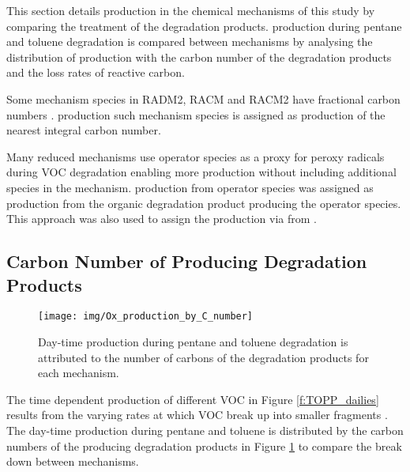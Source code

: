 This section details  production in the chemical mechanisms of this study by comparing the treatment of the degradation products.
 production during pentane and toluene degradation is compared between mechanisms by analysing the distribution of  production with the carbon number of the degradation products and the loss rates of reactive carbon.

Some mechanism species in RADM2, RACM and RACM2 have fractional carbon numbers \citep{Stockwell:1990, Stockwell:1997, Goliff:2013}.
 production such mechanism species is assigned as  production of the nearest integral carbon number.

Many reduced mechanisms use operator species as a proxy for peroxy radicals during VOC degradation enabling more  production without including additional species in the mechanism.
 production from operator species was assigned as  production from the organic degradation product producing the operator species.
This approach was also used to assign the  production via  from .

\subsection[Carbon Number of Ox Producing Degradation Products]{Carbon Number of  Producing Degradation Products} \label{ss:c_number} %

\begin{figure}
    \centering
    \texttt{[image: img/Ox\_production\_by\_C\_number]}
    \vspace{0mm}
    \caption{Day-time  production during pentane and toluene degradation is attributed to the number of carbons of the degradation products for each mechanism.}
    \vspace{-4mm}
    \label{f:carbon}
\end{figure}

The time dependent  production of different VOC in Figure \ref{f:TOPP_dailies} results from the varying rates at which VOC break up into smaller fragments \citep{Butler:2011}.
The day-time  production during pentane and toluene is distributed by the carbon numbers of the  producing degradation products in Figure \ref{f:carbon} to compare the break down between mechanisms.

